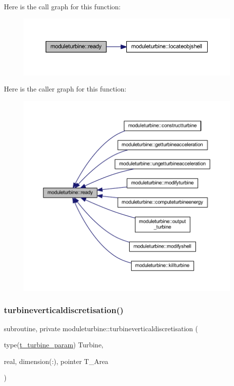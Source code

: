 Here is the call graph for this function\+:\nopagebreak
\begin{figure}[H]
\begin{center}
\leavevmode
\includegraphics[width=350pt]{namespacemoduleturbine_a05e91853a3be1ed656ff05d69618a83d_cgraph}
\end{center}
\end{figure}
Here is the caller graph for this function\+:\nopagebreak
\begin{figure}[H]
\begin{center}
\leavevmode
\includegraphics[width=350pt]{namespacemoduleturbine_a05e91853a3be1ed656ff05d69618a83d_icgraph}
\end{center}
\end{figure}
\mbox{\label{namespacemoduleturbine_a796f4418d909ff969c2d9169148e3414}} 
\subsubsection{\texorpdfstring{turbineverticaldiscretisation()}{turbineverticaldiscretisation()}}
{\footnotesize\ttfamily subroutine, private moduleturbine\+::turbineverticaldiscretisation (\begin{DoxyParamCaption}\item[{type(\mbox{\hyperlink{structmoduleturbine_1_1t__turbine__param}{t\+\_\+turbine\+\_\+param}})}]{Turbine,  }\item[{real, dimension(\+:), pointer}]{T\+\_\+\+Area }\end{DoxyParamCaption})\hspace{0.3cm}{\ttfamily [private]}}

